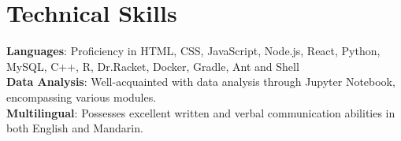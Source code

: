 \documentclass[letterpaper,11pt]{article}
\begin{document}
%
\section{Technical Skills}
  \begin{itemize}[leftmargin=0.15in, label={}]
    \small{\item{
      \textbf{Languages}{: Proficiency in HTML, CSS, JavaScript, Node.js, React, Python, MySQL, C++, R, Dr.Racket, Docker, Gradle, Ant and Shell} \\
      \textbf{Data Analysis}{: Well-acquainted with data analysis through Jupyter Notebook, encompassing various modules.} \\
      \textbf{Multilingual}{: Possesses excellent written and verbal communication abilities in both English and Mandarin.}
    }}
  \end{itemize}


\end{document}
